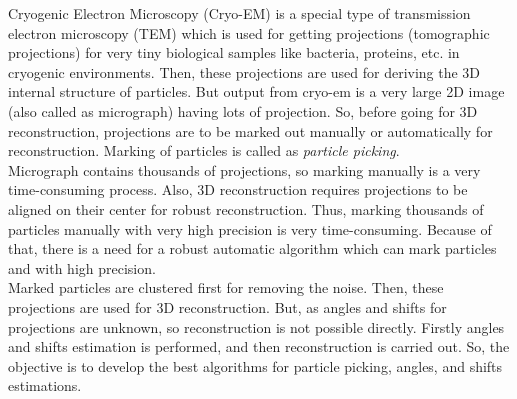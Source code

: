 \begin{Abstract}
Cryogenic Electron Microscopy (Cryo-EM) is a special type of transmission electron microscopy (TEM) which is used for getting projections (tomographic projections) for very tiny biological samples like bacteria, proteins, etc. in cryogenic environments. Then, these projections are used for deriving the 3D internal structure of particles. But output from cryo-em is a very large 2D image (also called as micrograph) having lots of projection. So, before going for 3D reconstruction,  projections are to be marked out manually or automatically for reconstruction. Marking of particles is called as \textit{particle picking}.\\

Micrograph contains thousands of projections, so marking manually is a very time-consuming process. Also, 3D reconstruction requires projections to be aligned on their center for robust reconstruction. Thus, marking thousands of particles manually with very high precision is very time-consuming.  Because of that, there is a need for a robust automatic algorithm which can mark particles and with high precision.\\

Marked particles are clustered first for removing the noise. Then, these projections are used for 3D reconstruction. But,  as angles and shifts for projections are unknown, so reconstruction is not possible directly. Firstly angles and shifts estimation is performed, and then reconstruction is carried out.  So, the objective is to develop the best algorithms for particle picking, angles, and shifts estimations.


\end{Abstract}

